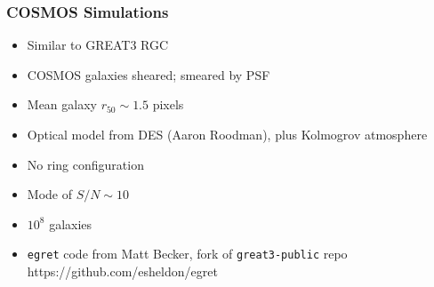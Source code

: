 \documentclass{beamer}
\begin{document}
\frame
{
    \frametitle{COSMOS Simulations}

 
    \begin{itemize}
        \item Similar to {\color{lightskyblue} GREAT3 RGC}

        \item COSMOS galaxies sheared; smeared by PSF
        \item Mean galaxy $r_{50} \sim 1.5$ pixels

        \item Optical model from DES (Aaron Roodman), plus Kolmogrov atmosphere
        \item {\color{gold} No ring} configuration
        \item Mode of {\color{orange} $S/N \sim 10$}
        \item $10^8$ galaxies

        \item {\color{gold} \texttt{egret}} code from Matt Becker, fork of \texttt{great3-public} repo
            https://github.com/esheldon/egret

    \end{itemize}

}
\end{document}
